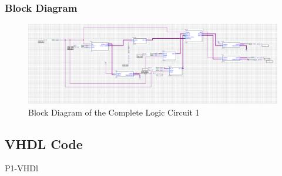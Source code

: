     \subsubsection{{Block Diagram}}

        \begin{figure}[H]
            \centering
            \includegraphics[width=15cm]{Pictures/P12BlockDia.png}
            \caption{{Block Diagram of the Complete Logic Circuit 1}}
            \label{}
        \end{figure}

\subsection{{VHDL Code}}

    {P1-VHDl}
